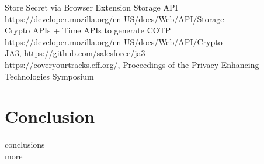 \documentclass[a4paper, 11pt]{article} 				%
\begin{document}
\noindent
Store Secret via Browser Extension Storage API\\
https://developer.mozilla.org/en-US/docs/Web/API/Storage\\

\noindent
Crypto APIs + Time APIs to generate COTP\\
https://developer.mozilla.org/en-US/docs/Web/API/Crypto\\


\noindent
JA3, https://github.com/salesforce/ja3\\

\noindent
https://coveryourtracks.eff.org/, Proceedings of the Privacy Enhancing Technologies Symposium

\section{Conclusion}
conclusions\\
more\\
\end{document}
